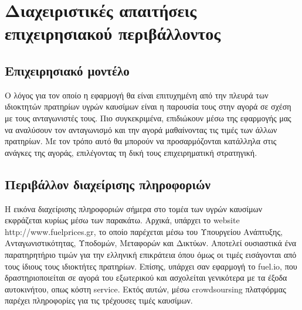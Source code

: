\section{Διαχειριστικές απαιτήσεις επιχειρησιακού περιβάλλοντος}

\subsection{Επιχειρησιακό μοντέλο}
Ο λόγος για τον οποίο η εφαρμογή θα είναι επιτυχημένη από την πλευρά των ιδιοκτητών πρατηρίων υγρών καυσίμων είναι η παρουσία τους στην αγορά σε σχέση με τους ανταγωνιστές τους.
Πιο συγκεκριμένα, επιδιώκουν μέσω της εφαρμογής μας να αναλύσουν τον ανταγωνισμό και την αγορά μαθαίνοντας τις τιμές των άλλων πρατηρίων. Με τον τρόπο αυτό θα μπορούν να προσαρμόζονται κατάλληλα στις ανάγκες της αγοράς, επιλέγοντας τη δική τους επιχειρηματική στρατηγική.


\subsection{Περιβάλλον διαχείρισης πληροφοριών}
Η εικόνα διαχείρισης πληροφοριών σήμερα στο τομέα των υγρών καυσίμων  εκφράζεται κυρίως μέσω των παρακάτω.
Αρχικά, υπάρχει το website http://www.fuelprices.gr, το οποίο παρέχεται μέσω του Υπουργείου Ανάπτυξης, Ανταγωνιστικότητας, Υποδομών, Μεταφορών και Δικτύων. Αποτελεί ουσιαστικά ένα παρατηρητήριο τιμών για την ελληνική επικράτεια όπου όμως οι τιμές εισάγονται από τους ίδιους τους ιδιοκτήτες πρατηρίων. 
Επίσης, υπάρχει σαν εφαρμογή το fuel.io, που δραστηριοποιείται σε αγορά του εξωτερικού και ασχολείται γενικότερα με τα έξοδα αυτοκινήτου, οπως κόστη service. Εκτός αυτών, μέσω crowdsoursing πλατφόρμας παρέχει πληροφορίες για τις τρέχουσες τιμές καυσίμων.
